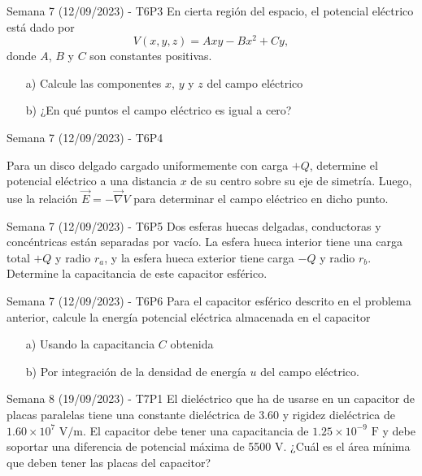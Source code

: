 \begin{frame}{Semana 7 (12/09/2023) - T6P3}
    En cierta región del espacio, el potencial eléctrico está dado por $$V(x, y, z) = Axy - Bx^2 + Cy,$$ donde $A$, $B$ y $C$ son constantes positivas.
    
    \begin{itemize}
        \item[a)] Calcule las componentes $x$, $y$ y $z$ del campo eléctrico
        \item[b)] ¿En qué puntos el campo eléctrico es igual a cero?
    \end{itemize}
\end{frame}

\begin{frame}{Semana 7 (12/09/2023) - T6P4}

Para un disco delgado cargado uniformemente con carga $+Q$, determine el potencial eléctrico a una distancia $x$ de su centro sobre su eje de simetría. Luego, use la relación $\vec{E}=-\vec{\nabla}V$ para determinar el campo eléctrico en dicho punto.
    
\end{frame}

\begin{frame}{Semana 7 (12/09/2023) - T6P5}
    Dos esferas huecas delgadas, conductoras y concéntricas están separadas por vacío. La esfera hueca interior tiene una carga total $+Q$ y radio $r_a$, y la esfera hueca exterior tiene carga $-Q$ y radio $r_b$. Determine la capacitancia de este capacitor esférico.
\end{frame}

\begin{frame}{Semana 7 (12/09/2023) - T6P6}
    Para el capacitor esférico descrito en el problema anterior, calcule la energía potencial eléctrica almacenada en el capacitor
    
    \begin{itemize}
        \item[a)] Usando la capacitancia $C$ obtenida
        \item[b)] Por integración de la densidad de energía $u$ del campo eléctrico.
    \end{itemize}
\end{frame}

\begin{frame}{Semana 8 (19/09/2023) - T7P1}
    El dieléctrico que ha de usarse en un capacitor de placas paralelas tiene una constante dieléctrica de 3.60 y rigidez dieléctrica de $1.60\times10^7 \text{ V}/\text{m}$. El capacitor debe tener una capacitancia de $1.25\times10^{-9} \text{ F}$ y debe soportar una diferencia de potencial máxima de 5500 V. ¿Cuál es el área mínima que deben tener las placas del capacitor?
    
\end{frame}

